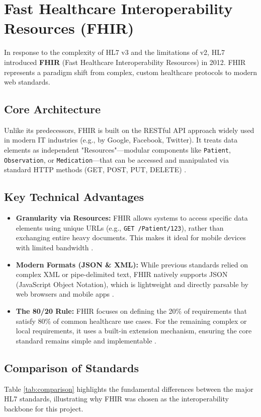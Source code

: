 \section{Fast Healthcare Interoperability Resources (FHIR)}

In response to the complexity of HL7 v3 and the limitations of v2, HL7
introduced \textbf{FHIR} (Fast Healthcare Interoperability Resources) in 2012.
FHIR represents a paradigm shift from complex, custom healthcare protocols to
modern web standards.

\subsection{Core Architecture}
Unlike its predecessors, FHIR is built on the RESTful API approach widely used
in modern IT industries (e.g., by Google, Facebook, Twitter). It treats data
elements as independent "Resources"—modular components like \texttt{Patient},
\texttt{Observation}, or \texttt{Medication}—that can be accessed and
manipulated via standard HTTP methods (GET, POST, PUT, DELETE)
\cite{wiki_fhir}.

\subsection{Key Technical Advantages}
\begin{itemize}
    \item \textbf{Granularity via Resources:} FHIR allows systems to access specific data elements using unique URLs (e.g., \texttt{GET /Patient/123}), rather than exchanging entire heavy documents. This makes it ideal for mobile devices with limited bandwidth \cite{wiki_fhir}.

    \item \textbf{Modern Formats (JSON \& XML):} While previous standards relied on complex XML or pipe-delimited text, FHIR natively supports  JSON  (JavaScript Object Notation), which is lightweight and directly parsable by web browsers and mobile apps \cite{intellisoft}.

    \item \textbf{The 80/20 Rule:} FHIR focuses on defining the 20\% of requirements that satisfy 80\% of common healthcare use cases. For the remaining complex or local requirements, it uses a built-in extension mechanism, ensuring the core standard remains simple and implementable \cite{repo}.
\end{itemize}

\subsection{Comparison of Standards}
Table \ref{tab:comparison} highlights the fundamental differences between the
major HL7 standards, illustrating why FHIR was chosen as the interoperability
backbone for this project.


